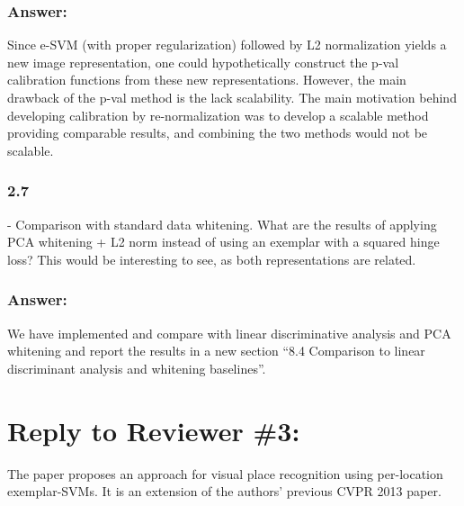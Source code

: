 \documentclass[a4paper,12pt]{article}
\begin{document}
\subsubsection*{Answer:}
Since e-SVM (with proper regularization) followed by L2 normalization yields a new image representation, one could hypothetically construct the p-val calibration functions from these new representations. However, the main drawback of the p-val method is the lack scalability. The main motivation behind developing calibration by re-normalization was to develop a scalable method providing comparable results, and combining the two methods would not be scalable.

\subsubsection*{2.7}
- Comparison with standard data whitening. What are the results of applying PCA whitening + L2 norm instead of using an exemplar with a squared hinge loss? This would be interesting to see, as both representations are related.

\subsubsection*{Answer:}
We have implemented and compare with linear discriminative analysis and PCA whitening and report the results in a new section “8.4 Comparison to linear discriminant analysis and whitening baselines”. 


\section*{Reply to Reviewer \#3:} 
 The paper proposes an approach for visual place recognition using per-location exemplar-SVMs. It is an extension of the authors' previous CVPR 2013 paper.
\end{document}
